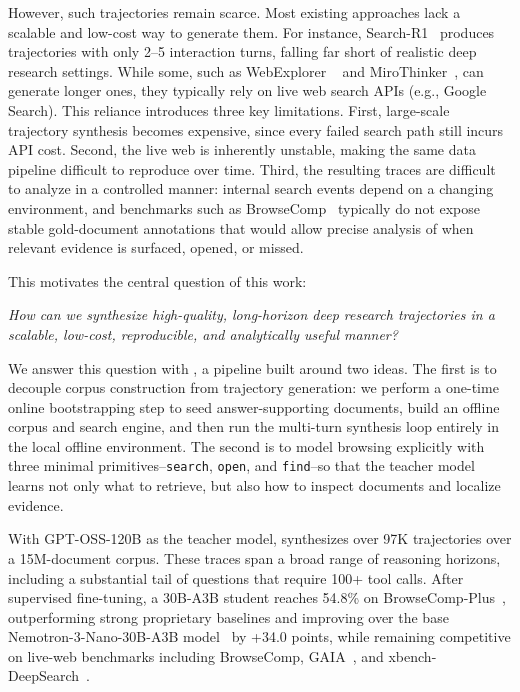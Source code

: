 However, such trajectories remain scarce. Most existing approaches lack a scalable and low-cost way to generate them. For instance, Search-R1~\citep{jin2025search} produces trajectories with only 2–5 interaction turns, falling far short of realistic deep research settings. While some, such as WebExplorer
~\citep{liu2025webexplorer} and MiroThinker~\citep{miromind2025mirothinker}, can generate longer ones, they typically rely on live web search APIs (e.g., Google Search). This reliance introduces three key limitations. First, large-scale trajectory synthesis becomes expensive, since every failed search path still incurs API cost. Second, the live web is inherently unstable, making the same data pipeline difficult to reproduce over time. Third, the resulting traces are difficult to analyze in a controlled manner: internal search events depend on a changing environment, and benchmarks such as BrowseComp~\citep{wei2025browsecomp} typically do not expose stable gold-document annotations that would allow precise analysis of when relevant evidence is surfaced, opened, or missed.

This motivates the central question of this work:

\vspace{1em}
\textit{How can we synthesize high-quality, long-horizon deep research trajectories in a scalable, low-cost, reproducible, and analytically useful manner?} 

\vspace{1em}

We answer this question with \model, a pipeline built around two ideas. The first is to decouple corpus construction from trajectory generation: we perform a one-time online bootstrapping step to seed answer-supporting documents, build an offline corpus and search engine, and then run the multi-turn synthesis loop entirely in the local offline environment. The second is to model browsing explicitly with three minimal primitives--\texttt{search}, \texttt{open}, and \texttt{find}--so that the teacher model learns not only what to retrieve, but also how to inspect documents and localize evidence.

With GPT-OSS-120B as the teacher model, \model synthesizes over 97K trajectories over a 15M-document corpus. These traces span a broad range of reasoning horizons, including a substantial tail of questions that require 100+ tool calls. After supervised fine-tuning, a 30B-A3B student reaches 54.8\% on BrowseComp-Plus~\citep{chen2025BrowseCompPlus}, outperforming strong proprietary baselines and improving over the base Nemotron-3-Nano-30B-A3B model~\citep{blakeman2025nemotron} by +34.0 points, while remaining competitive on live-web benchmarks including BrowseComp, GAIA~\citep{mialon2023gaia}, and xbench-DeepSearch~\citep{chen2025xbench}.

